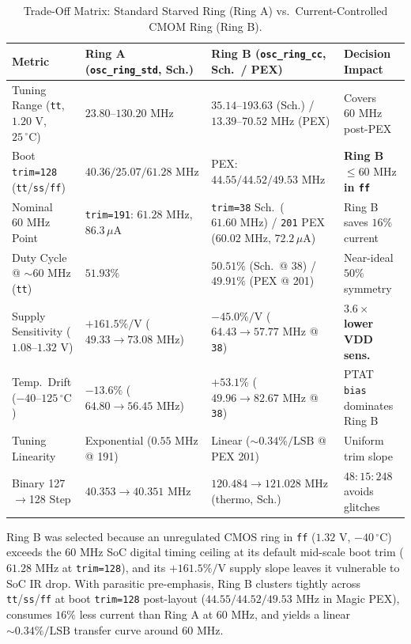 \documentclass[10pt,a4paper]{article}
\begin{document}
\begin{table}[H]
\centering
\caption{Trade-Off Matrix: Standard Starved Ring (Ring A) vs.\ Current-Controlled CMOM Ring (Ring B).}
\label{tab:ring_tradeoff}
\footnotesize
\setlength{\tabcolsep}{4pt}
\begin{tabularx}{\textwidth}{@{}>{\raggedright\arraybackslash}p{3.4cm} >{\raggedright\arraybackslash}X >{\raggedright\arraybackslash}X >{\raggedright\arraybackslash}p{3.1cm}@{}}
\toprule
\textbf{Metric} & \textbf{Ring A (\texttt{osc\_ring\_std}, Sch.)} & \textbf{Ring B (\texttt{osc\_ring\_cc}, Sch.\ / PEX)} & \textbf{Decision Impact} \\
\midrule
Tuning Range (\texttt{tt}, $1.20\text{ V}$, $25\,^\circ\text{C}$) & $23.80$--$130.20\text{ MHz}$ & $35.14$--$193.63$ (Sch.) / $13.39$--$70.52\text{ MHz}$ (PEX) & Covers $60\text{ MHz}$ post-PEX \\
Boot \texttt{trim=128} (\texttt{tt}/\texttt{ss}/\texttt{ff}) & $40.36 / 25.07 / \mathbf{61.28}\text{ MHz}$ & PEX: $44.55 / 44.52 / \mathbf{49.53}\text{ MHz}$ & \textbf{Ring B $\le 60\text{ MHz}$ in \texttt{ff}} \\
Nominal $60\text{ MHz}$ Point & \texttt{trim=191}: $61.28\text{ MHz}$, $86.3\,\mu\text{A}$ & \texttt{trim=38} Sch.\ ($61.60\text{ MHz}$) / \texttt{201} PEX ($60.02\text{ MHz}$, $72.2\,\mu\text{A}$) & Ring B saves $16\%$ current \\
Duty Cycle @ $\sim 60\text{ MHz}$ (\texttt{tt}) & $51.93\%$ & $50.51\%$ (Sch.\ @ 38) / $49.91\%$ (PEX @ 201) & Near-ideal $50\%$ symmetry \\
Supply Sensitivity ($1.08$--$1.32\text{ V}$) & $+161.5\%/\text{V}$ ($49.33 \to 73.08\text{ MHz}$) & $-45.0\%/\text{V}$ ($64.43 \to 57.77\text{ MHz}$ @ \texttt{38}) & \textbf{$3.6\times$ lower VDD sens.} \\
Temp.\ Drift ($-40$--$125\,^\circ\text{C}$) & $-13.6\%$ ($64.80 \to 56.45\text{ MHz}$) & $+53.1\%$ ($49.96 \to 82.67\text{ MHz}$ @ \texttt{38}) & PTAT \texttt{bias} dominates Ring B \\
Tuning Linearity & Exponential ($0.55\text{ MHz}$ @ 191) & Linear ($\sim 0.34\%/\text{LSB}$ @ PEX 201) & Uniform trim slope \\
Binary 127$\to$128 Step & $40.353 \to 40.351\text{ MHz}$ & $120.484 \to 121.028\text{ MHz}$ (thermo, Sch.) & $48{:}15{:}248$ avoids glitches \\
\bottomrule
\end{tabularx}
\end{table}

Ring B was selected because an unregulated CMOS ring in \texttt{ff} ($1.32\text{ V}$, $-40\,^\circ\text{C}$) exceeds the $60\text{ MHz}$ SoC digital timing ceiling at its default mid-scale boot trim ($61.28\text{ MHz}$ at \texttt{trim=128}), and its $+161.5\%/\text{V}$ supply slope leaves it vulnerable to SoC IR drop. With parasitic pre-emphasis, Ring B clusters tightly across \texttt{tt}/\texttt{ss}/\texttt{ff} at boot \texttt{trim=128} post-layout ($44.55 / 44.52 / 49.53\text{ MHz}$ in Magic PEX), consumes $16\%$ less current than Ring A at $60\text{ MHz}$, and yields a linear $\sim 0.34\%/\text{LSB}$ transfer curve around $60\text{ MHz}$.
\end{document}
